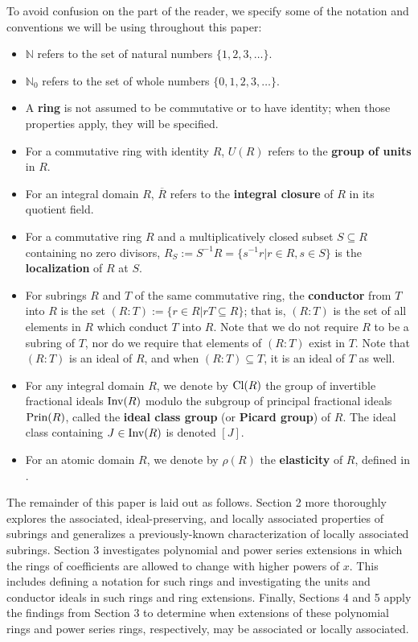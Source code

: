 \documentclass[12pt]{amsart}
\theoremstyle{definition}
\newcommand{\bN}{\mathbb N}
\newcommand{\Rbar}{{\overline{R}}}
\newcommand{\Inv}{\textup{Inv}}
\newcommand{\Prin}{\textup{Prin}}
\newcommand{\Cl}{\textup{Cl}}
\newcommand{\term}[1]{\textbf{\textup{#1}}}
\begin{document}
To avoid confusion on the part of the reader, we specify some of the notation and conventions we will be using throughout this paper:
\begin{itemize}
    \item $\bN$ refers to the set of natural numbers $\{1,2,3,\dots\}$.
    \item $\bN_0$ refers to the set of whole numbers $\{0,1,2,3,\dots\}$.
    \item A \term{ring} is not assumed to be commutative or to have identity; when those properties apply, they will be specified.
    \item For a commutative ring with identity $R$, $U(R)$ refers to the \term{group of units} in $R$.
    \item For an integral domain $R$, $\Rbar$ refers to the \term{integral closure} of $R$ in its quotient field.
    \item For a commutative ring $R$ and a multiplicatively closed subset $S\subseteq R$ containing no zero divisors, $R_S:=S^{-1}R=\{s^{-1}r|r\in R,s\in S\}$ is the \term{localization} of $R$ at $S$.
    \item For subrings $R$ and $T$ of the same commutative ring, the \term{conductor} from $T$ into $R$ is the set $(R:T):=\{r\in R|rT\subseteq R\}$; that is, $(R:T)$ is the set of all elements in $R$ which conduct $T$ into $R$. Note that we do not require $R$ to be a subring of $T$, nor do we require that elements of $(R:T)$ exist in $T$. Note that $(R:T)$ is an ideal of $R$, and when $(R:T)\subseteq T$, it is an ideal of $T$ as well.
    \item For any integral domain $R$, we denote by $\Cl(R)$ the group of invertible fractional ideals $\Inv(R)$ modulo the subgroup of principal fractional ideals $\Prin(R)$, called the \term{ideal class group} (or \term{Picard group}) of $R$. The ideal class containing $J\in \Inv(R)$ is denoted $[J]$.
    \item For an atomic domain $R$, we denote by $\rho(R)$ the \term{elasticity} of $R$, defined in \cite{valenza}.
\end{itemize}

The remainder of this paper is laid out as follows. Section 2 more thoroughly explores the associated, ideal-preserving, and locally associated properties of subrings and generalizes a previously-known characterization of locally associated subrings. Section 3 investigates polynomial and power series extensions in which the rings of coefficients are allowed to change with higher powers of $x$. This includes defining a notation for such rings and investigating the units and conductor ideals in such rings and ring extensions. Finally, Sections 4 and 5 apply the findings from Section 3 to determine when extensions of these polynomial rings and power series rings, respectively, may be associated or locally associated.
\end{document}
